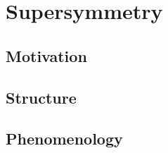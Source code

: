 \chapter{Supersymmetry}

\label{ch:supersymmetry}

\section{Motivation}


\section{Structure}


\section{Phenomenology}

